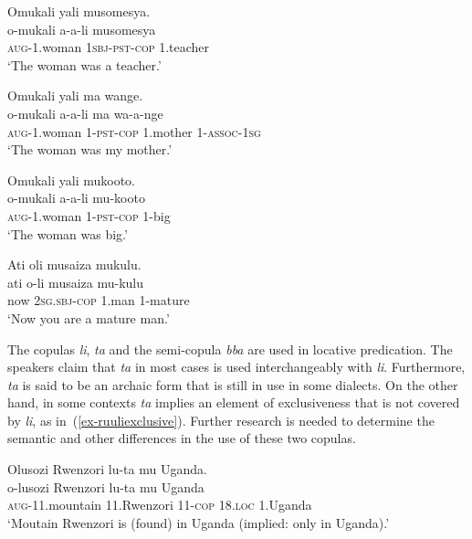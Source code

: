 \ea \label{ex-ruulinonverbal2}
\begin{xlist}
\ex \label{ex-ruulinocopula4}
	\glll Omukali yali musomesya.\\
	  o-mukali a-a-li musomesya\\
		\textsc{aug}-1.woman \textsc{1sbj}-\textsc{pst}-\textsc{cop} 1.teacher\\
	\glt ‘The woman was a teacher.’ 
	
\ex \label{ex-ruulinocopula5}
	\glll Omukali yali ma wange.\\
	  o-mukali a-a-li ma wa-a-nge\\
		\textsc{aug}-1.woman 1-\textsc{pst}-\textsc{cop} 1.mother 1-\textsc{assoc}-\textsc{1sg}\\
	\glt ‘The woman was my mother.’ 
	
\ex \label{ex-ruulinocopula6}
	\glll Omukali yali mukooto.\\
		   o-mukali a-a-li mu-kooto\\
		\textsc{aug}-1.woman 1-\textsc{pst}-\textsc{cop} 1-big\\
	\glt ‘The woman was big.’

\ex\label{ex-ruulinocopula7}
	\glll Ati oli musaiza mukulu.\\
	  ati o-li musaiza mu-kulu\\
		now 2\textsc{sg.sbj}-\textsc{cop} 1.man 1-mature\\
	\glt ‘Now you are a mature man.’ 

\end{xlist}
\z

The copulas \textit{li}, \textit{ta} and the semi-copula \textit{bba} are used in locative predication. 
The speakers claim that \textit{ta} in most cases is used interchangeably with \textit{li}. 
Furthermore, \textit{ta} is said to be an archaic form that is still in use in some dialects. 
On the other hand, in some contexts \textit{ta} implies an element of exclusiveness that is not covered by \textit{li}, as in~(\ref{ex-ruuliexclusive}). 
Further research is needed to determine the semantic and other differences in the use of these two copulas.

\ea \label{ex-ruuliexclusive}
	\glll Olusozi Rwenzori lu-ta mu Uganda.\\
	  o-lusozi Rwenzori lu-ta 			mu Uganda\\
		\textsc{aug}-11.mountain 11.Rwenzori 11-\textsc{cop} 18.\textsc{loc} 1.Uganda\\
\glt ‘Moutain Rwenzori is (found) in Uganda (implied: only in Uganda).’ 
\z

